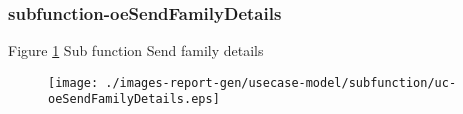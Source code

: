 \subsubsection{subfunction-oeSendFamilyDetails}

\label{RE-use-case-oeSendFamilyDetails}


Figure \ref{fig:lu.uni.lassy.excalibur.g01.specification-RE-UCD-uc-oeSendFamilyDetails}
Sub function Send family details

\begin{figure}[htbp]
\begin{center}

\texttt{[image: ./images-report-gen/usecase-model/subfunction/uc-oeSendFamilyDetails.eps]}
\end{center}
\caption[lu.uni.lassy.excalibur.g01.specification Use Case Diagram: uc-oeSendFamilyDetails]{}
\label{fig:lu.uni.lassy.excalibur.g01.specification-RE-UCD-uc-oeSendFamilyDetails}
\end{figure}
\vspace{0.5cm}
